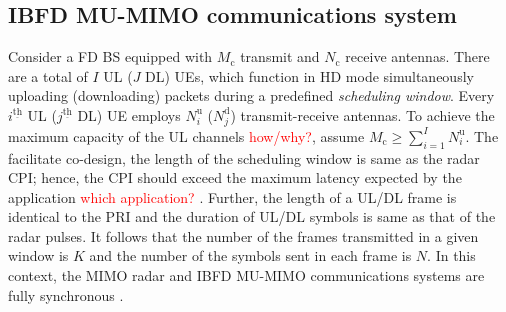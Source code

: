 \documentclass[9pt,journal]{IEEEtran}
\newcommand{\braces}[1]{{\left\{ {#1}\right\}}}
\newcommand{\ith}[1]    {{#1}^{\underline{\text{th}}}}
\newcommand{\cc}{_\mathrm{c}}
\theoremstyle{definition}
\begin{document}
\subsection{IBFD MU-MIMO communications system}
Consider a FD BS equipped with $\mathit{M}_\textrm{c}$ transmit and $\mathit{N}_{\textrm{c}}$ receive antennas. There are a total of $\mathit{I}$ UL ($\mathit{J}$ DL) UEs, which function in HD mode simultaneously uploading (downloading) packets during a predefined \textit{scheduling  window}. Every $\ith{i}$ UL ($\ith{j}$ DL) UE employs $\mathit{N}^{\textrm{u}}_i$ ($\mathit{N}^{\textrm{d}}_j$) transmit-receive antennas. %
To achieve the maximum capacity of the UL channels \textcolor{red}{how/why?}, assume $\mathit{M}\cc\geq\sum_{i=1}^{\mathit{I}}\mathit{N}^{\textrm{u}}_i$\cite{MIMOcom}. The facilitate co-design, the length of the scheduling window is same as the radar CPI; hence, the CPI should exceed the maximum latency expected by the application \textcolor{red}{which application?} \cite{ShiftMIMO}. Further, the length of a UL/DL frame is identical to the PRI and the duration of UL/DL symbols is same as that of the radar pulses. It follows that the number of the frames transmitted in a given window is $\mathit{K}$ and the number of the symbols sent in each frame is $\mathit{N}$. %
In this context, the MIMO radar and IBFD MU-MIMO communications systems are fully synchronous \cite{MCMIMO_RadComm}. 
\end{document}
